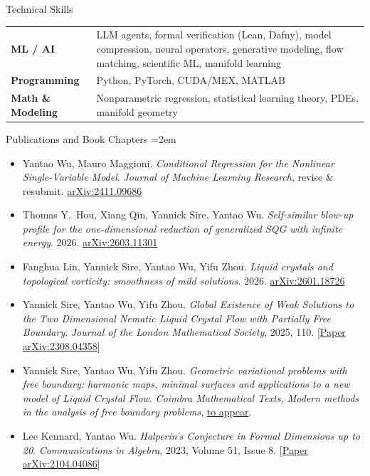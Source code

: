 \documentclass{resume}
\begin{document}
\begin{rSection}{Technical Skills}

\begin{tabular}{@{} >{\bfseries}p{3.4cm} p{13.5cm} @{}}
ML / AI & LLM agents, formal verification (Lean, Dafny), model compression, neural operators, generative modeling, flow matching, scientific ML, manifold learning \\
Programming & Python, PyTorch, CUDA/MEX, MATLAB \\
Math \& Modeling & Nonparametric regression, statistical learning theory, PDEs, manifold geometry \\
\end{tabular}

\end{rSection}

\begin{rSection}{Publications and Book Chapters}
\begingroup
{}
\emergencystretch=2em
\begin{itemize}
 
    \item Yantao Wu, Mauro Maggioni. \textit{Conditional Regression for the Nonlinear Single-Variable Model}. {\it Journal of Machine Learning Research}, revise \& resubmit. \href{https://arxiv.org/abs/2411.09686}{arXiv:2411.09686}
    \item Thomas Y.\ Hou, Xiang Qin, Yannick Sire, Yantao Wu. \textit{Self-similar blow-up profile for the one-dimensional reduction of generalized SQG with infinite energy}. 2026. \href{https://arxiv.org/abs/2603.11301}{arXiv:2603.11301}
    \item Fanghua Lin, Yannick Sire, Yantao Wu, Yifu Zhou. \textit{Liquid crystals and topological vorticity: smoothness of mild solutions}. 2026. \href{https://arxiv.org/abs/2601.18726}{arXiv:2601.18726}
    \item Yannick Sire, Yantao Wu, Yifu Zhou. \textit{Global Existence of Weak Solutions to the Two Dimensional Nematic Liquid Crystal Flow with Partially Free Boundary}. {\it Journal of the London Mathematical Society}, 2025, 110. [\href{https://londmathsoc.onlinelibrary.wiley.com/doi/10.1112/jlms.70008}{Paper} \quad \href{https://arxiv.org/abs/2308.04358}{arXiv:2308.04358}]
    \item Yannick Sire, Yantao Wu, Yifu Zhou. \textit{Geometric variational problems with free boundary: harmonic maps, minimal surfaces and applications to a new model of Liquid Crystal Flow}. {\it Coimbra Mathematical Texts, Modern methods in the analysis of free boundary problems}, \href{https://www.mat.uc.pt/cmt/index.php/cmt}{to appear}.
    \item Lee Kennard, Yantao Wu. \textit{Halperin's Conjecture in Formal Dimensions up to 20}. {\it Communications in Algebra}, 2023, Volume 51, Issue 8. [\href{https://www.tandfonline.com/doi/abs/10.1080/00927872.2023.2186705}{Paper} \quad \href{https://arxiv.org/abs/2104.04086}{arXiv:2104.04086}]
\end{itemize}
\endgroup
\end{rSection}
\end{document}
